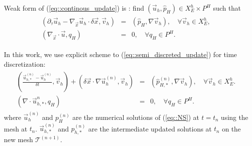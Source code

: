 \documentclass{eajam}
\begin{document}
\begin{enumerate}[step 1]
       Weak form of (\ref{eq::continous_update}) is : find $(\vec{u}_h,
       \hat{p}_H) \in X_E^h \times P^H$ such that 
       \begin{eqnarray}
         \begin{aligned}
           \left( \partial_{\tau} \vec{u}_h - \nabla_{\vec{x}}\vec{u}_h
           \cdot \delta \vec{x}, \vec{v}_h \right) & = & \left( \hat{p}_H, \nabla
           \vec{v}_h \right), \quad \forall \vec{v}_h \in X_E^h, \\
           \left( \nabla_{\vec{x}} \cdot \vec{u}, q_H\right) & = & 0, \quad \forall
           q_H \in P^H.
         \end{aligned}
         \label{eq::semi_discreted_update}
       \end{eqnarray}
       
       In this work, we use explicit scheme to
       (\ref{eq::semi_discreted_update}) for time discretization:
       \begin{eqnarray}
         \begin{aligned}
           \left ( \frac{\vec{u}_{h, *}^{(n)} - \vec{u}_h^{(n)}}{\delta
               t},
           \vec{v}_h \right) + \left( \delta \vec{x} \cdot \nabla 
           \vec{u}_{h}^{(n)}, \vec{v}_h \right)  & = & \left( 
           \hat{p}_{H, *}^{(n)}, \nabla \vec{v}_h \right), \quad
           \forall \vec{v}_h \in X_E^h. \\
           \left( \nabla \cdot \vec{u}_{h, *}^{n}, q_H \right) & = & 0, \quad
           \forall q_H \in P^H.
         \end{aligned}
         \label{eq::full_discreted_update}
       \end{eqnarray}
       where $\vec{u}_h^{(n)}$ and $p_H^{(n)}$ are the numerical
       solutions of (\ref{eq::NS}) at $t = t_{n}$ using the mesh at
       $t_n$. $\vec{u}_{h,*}^{(n)}$ and $p_{h, *}^{(n)}$ are the
       intermediate updated solutions at $t_{n}$ on the new
       mesh $\mathcal{T}^{(n + 1)}$. 
     \end{enumerate}  
\end{document}
